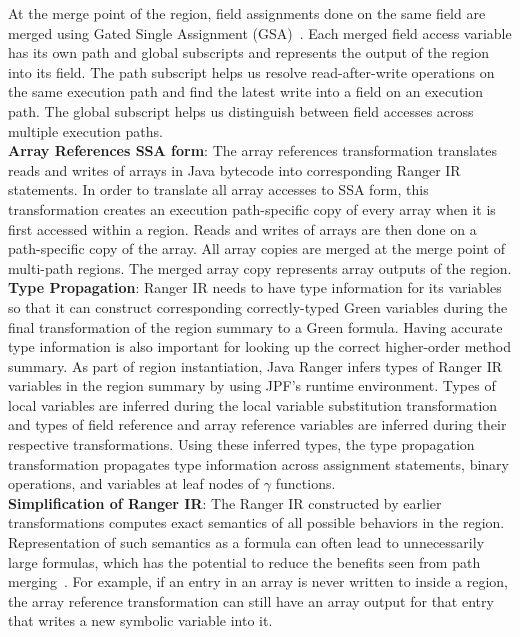 %
At the merge point of the region, field assignments done on the same field are merged using
Gated Single Assignment (GSA)~\cite{Ottenstein1990}.
%
Each merged field access variable has its own path and global subscripts and represents the output of the region into
its field.
%
The path subscript helps us resolve read-after-write operations on the same execution path and find the latest write
into a field on an execution path.
%
The global subscript helps us distinguish between field accesses across multiple execution paths. \\
\textbf{Array References SSA form}: The array references transformation translates reads and writes of arrays in
Java bytecode into corresponding Ranger IR statements.
%
In order to translate all array accesses to SSA form, this transformation creates an execution path-specific copy of
every array when it is first accessed within a region.
%
Reads and writes of arrays are then done on a path-specific copy of the array.
%
All array copies are merged at the merge point of multi-path regions.
%
The merged array copy represents array outputs of the region.\\
\textbf{Type Propagation}: Ranger IR needs to have type information for its variables so that it can construct
corresponding correctly-typed Green variables during the final transformation of the region summary to a Green formula.
%
Having accurate type information is also important for looking up the correct higher-order method summary.
%
As part of region instantiation, Java Ranger infers types of Ranger IR variables in the region summary by
using JPF's runtime environment.
%
Types of local variables are inferred during the local variable substitution transformation and types of field reference
and array reference variables are inferred during their respective transformations.
%
Using these inferred types, the type propagation transformation propagates type information across assignment
statements, binary operations, and variables at leaf nodes of $\gamma$ functions.\\
%
\textbf{Simplification of Ranger IR}: The Ranger IR constructed by earlier transformations computes exact semantics
of all possible behaviors in the region.
%
Representation of such semantics as a formula can often lead to unnecessarily large formulas, which has the potential to
reduce the benefits seen from path merging~\cite{angr}.
%
For example, if an entry in an array is never written to inside a region, the array reference transformation can still have an
array output for that entry that writes a new symbolic variable into it.
